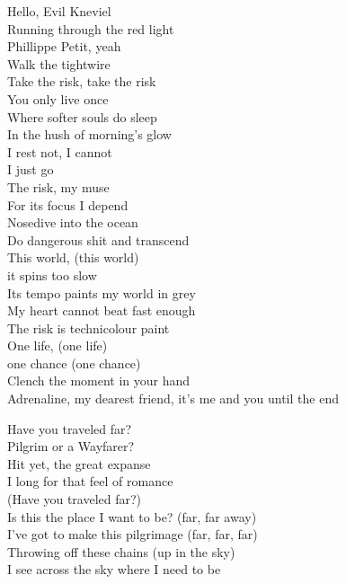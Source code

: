 
Hello, Evil Kneviel\\
Running through the red light\\
Phillippe Petit, yeah\\
Walk the tightwire\\
Take the risk, take the risk\\
You only live once\\

Where softer souls do sleep\\
In the hush of morning's glow\\
I rest not, I cannot\\
I just go\\
The risk, my muse\\
For its focus I depend\\
Nosedive into the ocean\\
Do dangerous shit and transcend\\
This world, (this world)\\
it spins too slow\\
Its tempo paints my world in grey\\
My heart cannot beat fast enough\\
The risk is technicolour paint\\
One life, (one life)\\
one chance (one chance)\\
Clench the moment in your hand\\
Adrenaline, my dearest friend, it's me and you until the end\\



Have you traveled far?\\
Pilgrim or a Wayfarer?\\
Hit yet, the great expanse\\
I long for that feel of romance\\

(Have you traveled far?)\\
Is this the place I want to be? (far, far away)\\
I've got to make this pilgrimage (far, far, far)\\
Throwing off these chains (up in the sky)\\
I see across the sky where I need to be\\

